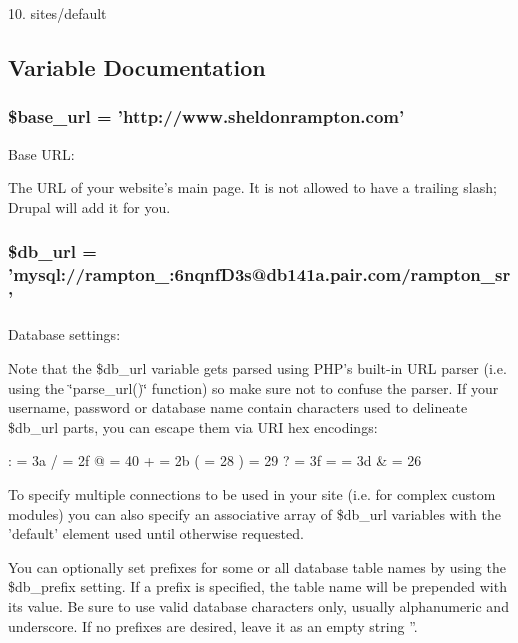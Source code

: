 10. sites/default 

\subsection{Variable Documentation}
\hypertarget{default_2settings_8php_6886427c9c643f707fcb35c018049bc7}{
\subsubsection[{\$base\_\-url}]{\setlength{\rightskip}{0pt plus 5cm}\$base\_\-url = 'http://www.sheldonrampton.com'}}
\label{default_2settings_8php_6886427c9c643f707fcb35c018049bc7}


Base URL:

The URL of your website's main page. It is not allowed to have a trailing slash; Drupal will add it for you. \hypertarget{default_2settings_8php_01f60cfc6d59f1f30585ac6b516d739b}{
\subsubsection[{\$db\_\-url}]{\setlength{\rightskip}{0pt plus 5cm}\$db\_\-url = 'mysql://rampton\_:6nqnfD3s@db141a.pair.com/rampton\_\-sr'}}
\label{default_2settings_8php_01f60cfc6d59f1f30585ac6b516d739b}


Database settings:

Note that the \$db\_\-url variable gets parsed using PHP's built-in URL parser (i.e. using the \char`\"{}parse\_\-url()\char`\"{} function) so make sure not to confuse the parser. If your username, password or database name contain characters used to delineate \$db\_\-url parts, you can escape them via URI hex encodings:

: = 3a / = 2f @ = 40 + = 2b ( = 28 ) = 29 ? = 3f = = 3d \& = 26

To specify multiple connections to be used in your site (i.e. for complex custom modules) you can also specify an associative array of \$db\_\-url variables with the 'default' element used until otherwise requested.

You can optionally set prefixes for some or all database table names by using the \$db\_\-prefix setting. If a prefix is specified, the table name will be prepended with its value. Be sure to use valid database characters only, usually alphanumeric and underscore. If no prefixes are desired, leave it as an empty string ''.

